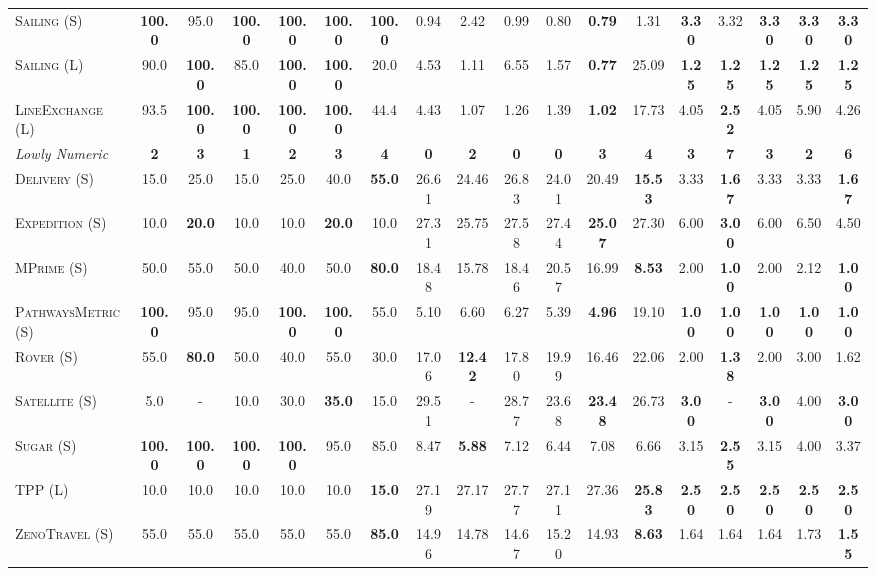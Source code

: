 \documentclass[11pt,landscape]{article}
\begin{document}
\begin{table*}[tb]
{\begin{tabular}{|l||cccccc||cccccc||ccccc||}
\textsc{Sailing} (S)&\textbf{100.0}&95.0&\textbf{100.0}&\textbf{100.0}&\textbf{100.0}&\textbf{100.0}&0.94&2.42&0.99&0.80&\textbf{0.79}&1.31&\textbf{3.30}&3.32&\textbf{3.30}&\textbf{3.30}&\textbf{3.30}\\
\textsc{Sailing} (L)&90.0&\textbf{100.0}&85.0&\textbf{100.0}&\textbf{100.0}&20.0&4.53&1.11&6.55&1.57&\textbf{0.77}&25.09&\textbf{1.25}&\textbf{1.25}&\textbf{1.25}&\textbf{1.25}&\textbf{1.25}\\
\textsc{LineExchange} (L)&93.5&\textbf{100.0}&\textbf{100.0}&\textbf{100.0}&\textbf{100.0}&44.4&4.43&1.07&1.26&1.39&\textbf{1.02}&17.73&4.05&\textbf{2.52}&4.05&5.90&4.26
\\\hline
\textit{Lowly Numeric}&\textbf{2}&\textbf{3}&\textbf{1}&\textbf{2}&\textbf{3}&\textbf{4}&\textbf{0}&\textbf{2}&\textbf{0}&\textbf{0}&\textbf{3}&\textbf{4}&\textbf{3}&\textbf{7}&\textbf{3}&\textbf{2}&\textbf{6}\\\hline
\textsc{Delivery} (S)&15.0&25.0&15.0&25.0&40.0&\textbf{55.0}&26.61&24.46&26.83&24.01&20.49&\textbf{15.53}&3.33&\textbf{1.67}&3.33&3.33&\textbf{1.67}\\
\textsc{Expedition} (S)&10.0&\textbf{20.0}&10.0&10.0&\textbf{20.0}&10.0&27.31&25.75&27.58&27.44&\textbf{25.07}&27.30&6.00&\textbf{3.00}&6.00&6.50&4.50\\
\textsc{MPrime} (S)&50.0&55.0&50.0&40.0&50.0&\textbf{80.0}&18.48&15.78&18.46&20.57&16.99&\textbf{8.53}&2.00&\textbf{1.00}&2.00&2.12&\textbf{1.00}\\
\textsc{PathwaysMetric} (S)&\textbf{100.0}&95.0&95.0&\textbf{100.0}&\textbf{100.0}&55.0&5.10&6.60&6.27&5.39&\textbf{4.96}&19.10&\textbf{1.00}&\textbf{1.00}&\textbf{1.00}&\textbf{1.00}&\textbf{1.00}\\
\textsc{Rover} (S)&55.0&\textbf{80.0}&50.0&40.0&55.0&30.0&17.06&\textbf{12.42}&17.80&19.99&16.46&22.06&2.00&\textbf{1.38}&2.00&3.00&1.62\\
\textsc{Satellite} (S)&5.0&-&10.0&30.0&\textbf{35.0}&15.0&29.51&-&28.77&23.68&\textbf{23.48}&26.73&\textbf{3.00}&-&\textbf{3.00}&4.00&\textbf{3.00}\\
\textsc{Sugar} (S)&\textbf{100.0}&\textbf{100.0}&\textbf{100.0}&\textbf{100.0}&95.0&85.0&8.47&\textbf{5.88}&7.12&6.44&7.08&6.66&3.15&\textbf{2.55}&3.15&4.00&3.37\\
\textsc{TPP} (L)&10.0&10.0&10.0&10.0&10.0&\textbf{15.0}&27.19&27.17&27.77&27.11&27.36&\textbf{25.83}&\textbf{2.50}&\textbf{2.50}&\textbf{2.50}&\textbf{2.50}&\textbf{2.50}\\
\textsc{ZenoTravel} (S)&55.0&55.0&55.0&55.0&55.0&\textbf{85.0}&14.96&14.78&14.67&15.20&14.93&\textbf{8.63}&1.64&1.64&1.64&1.73&\textbf{1.55}
\\\hline


\end{tabular}}
\end{table*}
\end{document}
